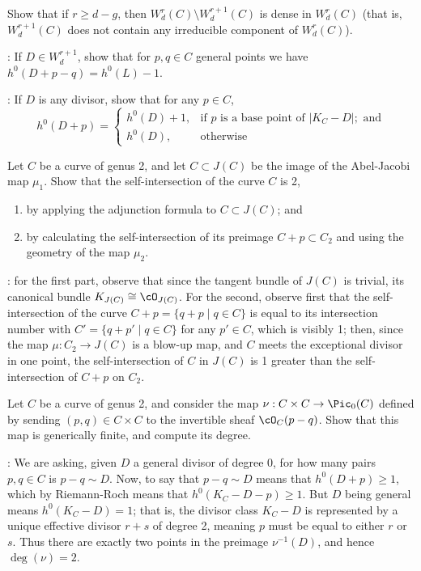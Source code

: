 \begin{exercise}
Show that if $r \geq d-g$, then $W^r_d(C) \setminus W^{r+1}_d(C)$ is dense in $W^r_d(C)$ (that is, $W^{r+1}_d(C)$ does not contain any irreducible component of $W^r_d(C)$).

: If $D \in W^{r+1}_d$, show that for $p, q \in C$ general points we have $h^0(D+p-q) = h^0(L) - 1$.

:  If $D$ is any divisor, show that for any $p \in C$,
$$
h^0(D+p) = 
\begin{cases}
h^0(D) + 1, &\text{if $p$ is a base point of } |K_C-D|; \text{ and} \\
h^0(D), &\text{otherwise}
\end{cases}
$$

\end{exercise}

\begin{exercise}
Let $C$ be a curve of genus 2, and let $C \subset J(C)$ be the image of the Abel-Jacobi map $\mu_1$. Show that the self-intersection of the curve $C$ is 2,
\begin{enumerate}
\item by applying the adjunction formula to $C \subset J(C)$; and
\item by calculating the self-intersection of its preimage $C + p \subset C_2$ and using the geometry of the map $\mu_2$.
\end{enumerate}

:  for the first part, observe that since the tangent bundle of $J(C)$ is trivial, its canonical bundle $K_{J(C)} \cong \cO_{J(C)}$. For the second, observe first that the self-intersection of the curve $C+p = \{q+p \mid q \in C\}$ is equal to its intersection number with $C' = \{q+p' \mid q \in C\}$ for any $p' \in C$, which is visibly 1; then, since the map $\mu : C_2 \to J(C)$ is a blow-up map, and $C$ meets the exceptional divisor in one point, the self-intersection of $C$ in $J(C)$ is 1 greater than the self-intersection of $C+p$ on $C_2$.
\end{exercise}

\begin{exercise}
Let $C$ be a curve of genus 2, and consider the map $\nu : C \times C \to \Pic_0(C)$ defined by sending $(p, q)\in C \times C$ to the invertible sheaf $\cO_C(p-q)$. Show that this map is generically finite, and compute its degree.

: We are asking, given $D$ a general divisor  of degree 0, for how many pairs $p, q \in C$ is $p-q \sim D$. Now, to say that   $p-q \sim D$ means that $h^0(D+p) \geq 1$, which by Riemann-Roch means that $h^0(K_C-D-p) \geq 1$. But $D$ being general means $h^0(K_C - D) = 1$; that is, the divisor class $K_C - D$ is represented by a unique effective divisor $r+s$ of degree 2, meaning $p$ must be equal to either $r$ or $s$. Thus there are exactly two points in the preimage $\nu^{-1}(D)$, and hence $\deg(\nu) = 2$.
\end{exercise}

